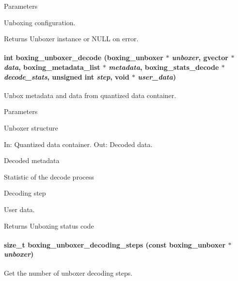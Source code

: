 \begin{DoxyParams}{Parameters}
\item[{\em parameters}]Unboxing configuration. \end{DoxyParams}
\begin{DoxyReturn}{Returns}
Unboxer instance or NULL on error. 
\end{DoxyReturn}
\hypertarget{group__unboxer_gaeba1508d04d3ba66f4ec5acd2ea71244}{
\paragraph[{boxing\_\-unboxer\_\-decode}]{\setlength{\rightskip}{0pt plus 5cm}int boxing\_\-unboxer\_\-decode (boxing\_\-unboxer $\ast$ {\em unboxer}, \/  gvector $\ast$ {\em data}, \/  boxing\_\-metadata\_\-list $\ast$ {\em metadata}, \/  boxing\_\-stats\_\-decode $\ast$ {\em decode\_\-stats}, \/  unsigned int {\em step}, \/  void $\ast$ {\em user\_\-data})}\hfill}
\label{group__unboxer_gaeba1508d04d3ba66f4ec5acd2ea71244}
Unbox metadata and data from quantized data container.


\begin{DoxyParams}{Parameters}
\item[\mbox{$\leftarrow$} {\em unboxer}]Unboxer structure \item[\mbox{$\leftrightarrow$} {\em data}]In: Quantized data container. Out: Decoded data. \item[\mbox{$\leftarrow$} {\em metadata}]Decoded metadata \item[\mbox{$\rightarrow$} {\em decode\_\-stats}]Statistic of the decode process \item[\mbox{$\leftarrow$} {\em step}]Decoding step \item[\mbox{$\leftarrow$} {\em user\_\-data}]User data. \end{DoxyParams}
\begin{DoxyReturn}{Returns}
Unboxing status code 
\end{DoxyReturn}
\hypertarget{group__unboxer_gab8716d553639132ce7fc268c4c7a2c50}{
\paragraph[{boxing\_\-unboxer\_\-decoding\_\-steps}]{\setlength{\rightskip}{0pt plus 5cm}size\_\-t boxing\_\-unboxer\_\-decoding\_\-steps (const boxing\_\-unboxer $\ast$ {\em unboxer})}\hfill}
\label{group__unboxer_gab8716d553639132ce7fc268c4c7a2c50}
Get the number of unboxer decoding steps.


